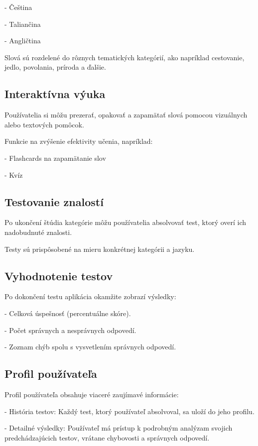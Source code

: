 \documentclass{article}
\begin{document}
- Čeština

- Taliančina

- Angličtina

Slová sú rozdelené do rôznych tematických kategórií, ako napríklad cestovanie, jedlo, povolania, príroda a ďalšie.

\subsection{Interaktívna výuka}

Používatelia si môžu prezerať, opakovať a zapamätať slová pomocou vizuálnych alebo textových pomôcok.

Funkcie na zvýšenie efektivity učenia, napríklad:

- Flashcards na zapamätanie slov

- Kvíz


\subsection{Testovanie znalostí}

Po ukončení štúdia kategórie môžu používatelia absolvovať test, ktorý overí ich nadobudnuté znalosti.

Testy sú prispôsobené na mieru konkrétnej kategórii a jazyku.

\subsection{Vyhodnotenie testov}

Po dokončení testu aplikácia okamžite zobrazí výsledky:

- Celková úspešnosť (percentuálne skóre).

- Počet správnych a nesprávnych odpovedí.

- Zoznam chýb spolu s vysvetlením správnych odpovedí.

\subsection{Profil používateľa}

Profil používateľa obsahuje viaceré zaujímavé informácie:

- História testov: Každý test, ktorý používateľ absolvoval, sa uloží do jeho profilu.

- Detailné výsledky: Používateľ má prístup k podrobným analýzam svojich predchádzajúcich testov, vrátane chybovosti a správnych odpovedí.
\end{document}
